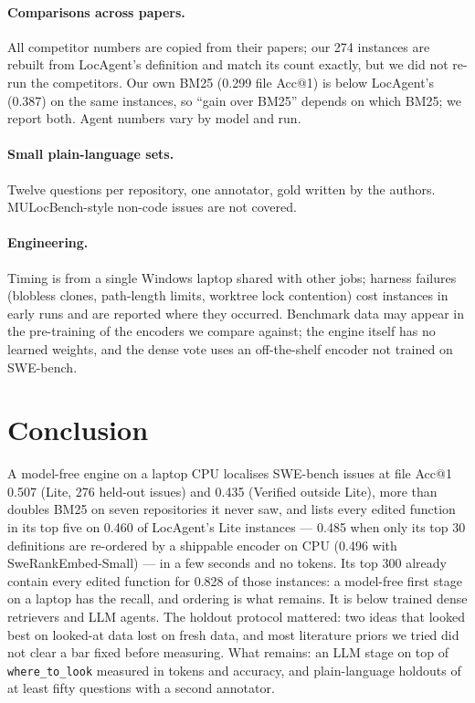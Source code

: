 \documentclass[10pt,twocolumn]{article}
\makeatletter
\newcommand{\accat}[1]{Acc@#1}
\makeatother
\begin{document}
\paragraph{Comparisons across papers.}
All competitor numbers are copied from their papers; our 274 instances are rebuilt from LocAgent's
definition and match its count exactly, but we did not re-run the competitors. Our own BM25 (0.299
file \accat{1}) is below LocAgent's (0.387) on the same instances, so ``gain over BM25'' depends on
which BM25; we report both. Agent numbers vary by model and run.

\paragraph{Small plain-language sets.}
Twelve questions per repository, one annotator, gold written by the authors. MULocBench-style
non-code issues are not covered.

\paragraph{Engineering.}
Timing is from a single Windows laptop shared with other jobs; harness failures (blobless clones,
path-length limits, worktree lock contention) cost instances in early runs and are reported where
they occurred. Benchmark data may appear in the pre-training of the encoders we compare against; the
engine itself has no learned weights, and the dense vote uses an off-the-shelf encoder not trained on
SWE-bench.

\section{Conclusion}
\label{sec:conclusion}

A model-free engine on a laptop CPU localises SWE-bench issues at file \accat{1} 0.507 (Lite, 276
held-out issues) and 0.435 (Verified outside Lite), more than doubles BM25 on seven repositories it
never saw, and lists every edited function in its top five on 0.460 of LocAgent's Lite instances ---
0.485 when only its top 30 definitions are re-ordered by a shippable encoder on CPU (0.496 with
SweRankEmbed-Small) --- in a few seconds and no tokens. Its top 300 already contain every edited
function for 0.828 of those instances: a model-free first stage on a laptop has the recall, and
ordering is what remains. It is below trained dense retrievers and LLM agents. The holdout protocol mattered: two ideas that looked best on looked-at data
lost on fresh data, and most literature priors we tried did not clear a bar fixed before measuring.
What remains: an LLM stage on top of \texttt{where\_to\_look} measured in tokens and accuracy, and
plain-language holdouts of at least fifty questions with a second annotator.
\end{document}
